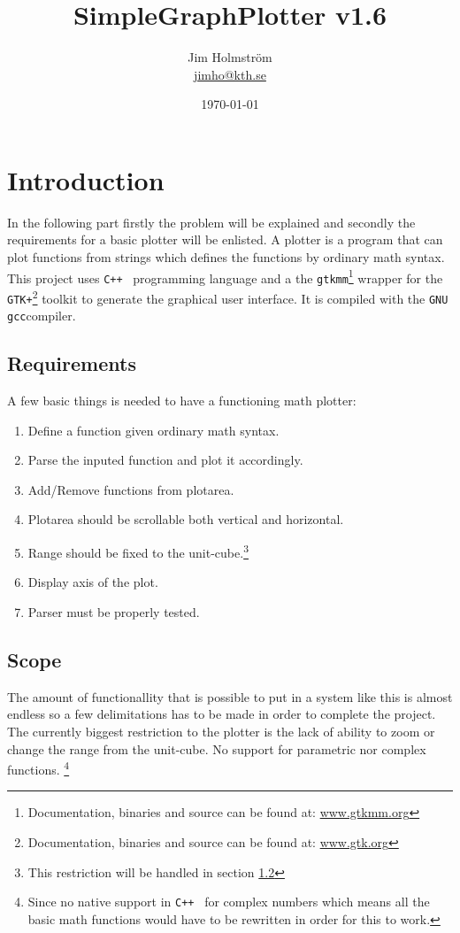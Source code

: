 \documentclass[a4paper,11pt]{kth-mag}
\title{SimpleGraphPlotter v1.6}
\subtitle{}
\author{Jim Holmstr\"{o}m\\\href{mailto:jimho@kth.se}{jimho@kth.se}}
\date{\today}
\newcommand{\Cpp}{\texttt{C++}}
\newcommand{\Gcc}{\texttt{gcc}}
\newcommand{\Gtkmm}{\texttt{gtkmm}}
\newcommand{\Gtk}{\texttt{GTK+}}
\begin{document}
\frontmatter
\pagestyle{empty}
\removepagenumbers
\maketitle
{}
\tableofcontents*
\mainmatter
\pagestyle{newchap}

\chapter{Introduction}
In the following part firstly the problem will be explained and secondly the requirements for a basic plotter will be enlisted.
A plotter is a program that can plot functions from strings which defines the functions by ordinary math syntax. 
This project uses \Cpp~ programming language and a the 
\Gtkmm\footnote{Documentation, binaries and source can be found at: \href{http://www.gtkmm.org}{www.gtkmm.org}} wrapper for the 
\Gtk\footnote{Documentation, binaries and source can be found at: \href{http://www.gtk.org}{www.gtk.org}} toolkit to generate the graphical user interface. 
It is compiled with the \texttt{GNU} \Gcc compiler.

\section{Requirements}
A few basic things is needed to have a functioning math plotter:
\begin{enumerate}
\item Define a function given ordinary math syntax.
\item Parse the inputed function and plot it accordingly.
\item Add/Remove functions from plotarea.
\item Plotarea should be scrollable both vertical and horizontal.
\item Range should be fixed to the unit-cube.\footnote{This restriction will be handled in section \ref{sec:scope}}
\item Display axis of the plot.
\item Parser must be properly tested.
\end{enumerate}

\section{Scope}
\label{sec:scope}
The amount of functionallity that is possible to put in a system like this is almost endless so a few delimitations has to be made in order to complete the project.
The currently biggest restriction to the plotter is the lack of ability to zoom or change the range from the unit-cube.
No support for parametric nor complex functions.
\footnote{Since no native support in \Cpp~ for complex numbers which means all the basic math functions would have to be rewritten in order for this to work.}
\end{document}
